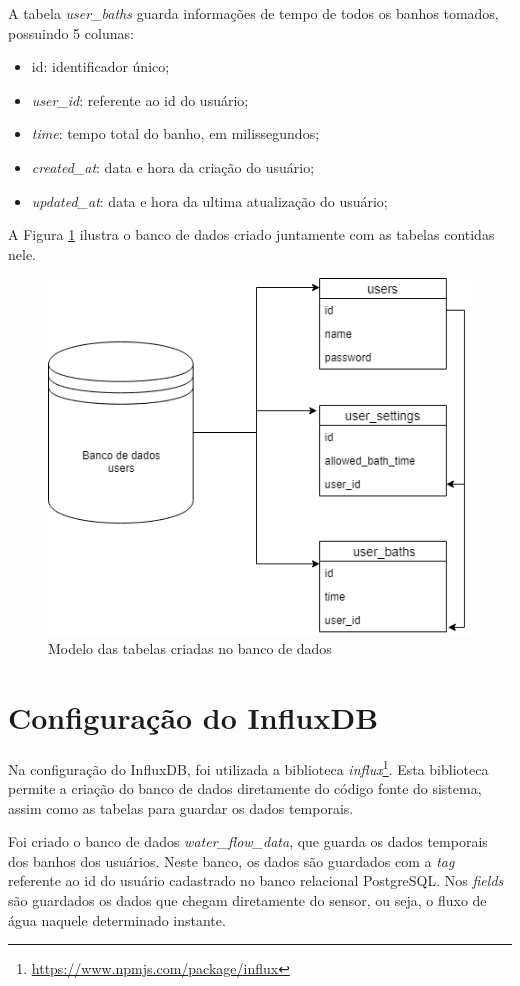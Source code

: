 A tabela \textit{user\_baths} guarda informações de tempo de todos os banhos tomados, possuindo 5 colunas:

\begin{itemize}
	\item id: identificador único;
	\item \textit{user\_id}: referente ao id do usuário;
	\item \textit{time}: tempo total do banho, em milissegundos;
	\item \textit{created\_at}: data e hora da criação do usuário;
	\item \textit{updated\_at}: data e hora da ultima atualização do usuário;
\end{itemize}

A Figura \ref{fig:modeltables} ilustra o banco de dados criado juntamente com as tabelas contidas nele.

\begin{figure}[htbp]
	\centering
	\includegraphics[width=0.6\linewidth]{figuras/postgrediagram.png}
	\caption{Modelo das tabelas criadas no banco de dados}
	\label{fig:modeltables}
\end{figure}

\newpage

\section{Configuração do InfluxDB}

Na configuração do InfluxDB, foi utilizada a biblioteca \textit{influx}\footnote{\url{https://www.npmjs.com/package/influx}}. Esta biblioteca permite a criação do banco de dados diretamente do código fonte do sistema, assim como as tabelas para guardar os dados temporais.

Foi criado o banco de dados \textit{water\_flow\_data}, que guarda os dados temporais dos banhos dos usuários. Neste banco, os dados são guardados com a \textit{tag} referente ao id do usuário cadastrado no banco relacional PostgreSQL. Nos \textit{fields} são guardados os dados que chegam diretamente do sensor, ou seja, o fluxo de água naquele determinado instante.


